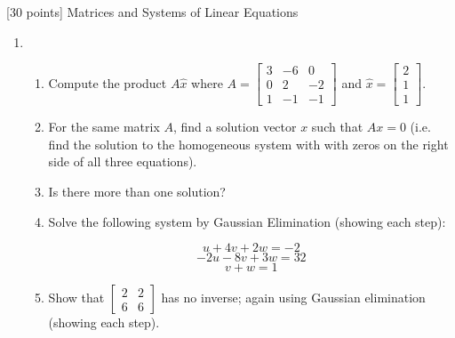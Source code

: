 [30 points] Matrices and Systems of Linear Equations\\

\vspace{0.1in}

\begin{enumerate}
    \item 
    \begin{enumerate}
        \item Compute the product $A\hat{x}$
        where $\displaystyle A = \begin{bmatrix}
        3 & -6 & 0\\
        0 & 2 & -2\\
        1 & -1 & -1
        \end{bmatrix}$ and $ \displaystyle \hat{x}=
        \begin{bmatrix}
        2\\
        1\\
        1
        \end{bmatrix}$.

        \item For the same matrix \(A\), 
        find a solution vector $x$ such that \(Ax=0\) 
        (i.e. find the solution to the homogeneous system with with zeros on the right side of all three equations). 
        \item Is there more than one solution?
    
    \item Solve the following system by Gaussian Elimination (showing each step):

    \[u + 4v + 2w = -2\]
    \[-2u - 8v +3w = 32\]
    \[v + w =1\]

    \item Show that \(\begin{bmatrix}
    2 & 2\\
    6 & 6
    \end{bmatrix}\)
    has no inverse; 
    again using Gaussian elimination (showing each step).



\end{enumerate}
\end{enumerate}
